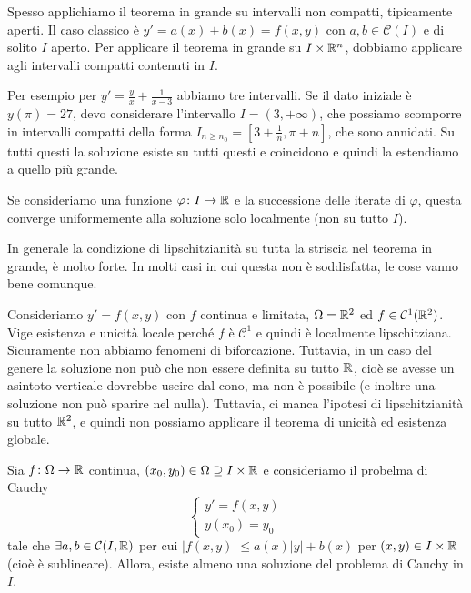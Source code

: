 \documentclass[a4paper]{article}
\begin{document}
Spesso applichiamo il teorema in grande su intervalli non compatti, tipicamente aperti.
Il caso classico è \(y' = a(x) + b(x) = f(x,y)\) con \(a,b \in \mathcal C(I)\)
e di solito \(I\) aperto.
Per applicare il teorema in grande su \(I \times \mathbb{R}^n\),
dobbiamo applicare agli intervalli compatti contenuti in \(I\).

Per esempio per \(y' = \frac yx + \frac 1{x-3}\)
abbiamo tre intervalli. Se il dato iniziale è \(y(\pi) = 27\), devo considerare l'intervallo
\(I = (3, +\infty)\), che possiamo scomporre in intervalli compatti della forma \(I_{n \geq n_0} = \left[3 + \frac 1n, \pi + n\right]\),
che sono annidati. Su tutti questi
la soluzione esiste su tutti questi e coincidono e quindi la estendiamo a quello più grande.

Se consideriamo una funzione \(\varphi \colon I \to \mathbb{R}\) e la successione delle iterate
di \(\varphi\), questa converge uniformemente alla soluzione solo localmente (non su tutto \(I\)).

In generale la condizione di lipschitzianità su tutta la striscia nel teorema in grande,
è molto forte. In molti casi in cui questa non è soddisfatta, le cose vanno bene comunque.

\begin{snippetexample}{}
    Consideriamo
    \(y' = f(x,y)\) con \(f\) continua e limitata, \(\Omega = \mathbb{R}^2\) ed
    \(f \in \mathcal C^1(\mathbb{R}^2)\).
    Vige esistenza e unicità locale perché \(f\)
    è \(\mathcal C^1\) e quindi è localmente lipschitziana.
    Sicuramente non abbiamo fenomeni di biforcazione.
    Tuttavia, in un caso del genere la soluzione non può che non essere definita su tutto \(\mathbb{R}\),
    cioè se avesse un asintoto verticale dovrebbe uscire dal cono, ma non è possibile (e inoltre una soluzione non può sparire nel nulla).
    Tuttavia, ci manca l'ipotesi di lipschitzianità su tutto \(\mathbb{R}^2\),
    e quindi non possiamo applicare il teorema di unicità ed esistenza globale.
\end{snippetexample}

\begin{snippettheorem}{}
    Sia \(f \colon \Omega \to \mathbb{R}\) continua,
    \((x_0, y_0) \in \Omega \supseteq I \times \mathbb{R}\) e consideriamo il probelma di Cauchy
    \[
        \begin{cases}
            y' = f(x,y) \\
            y(x_0) = y_0
        \end{cases}
    \]
    tale che \(\exists a,b \in \mathcal C(I, \mathbb{R})\)
    per cui \(|f(x,y)| \leq a(x)|y| + b(x)\)
    per \((x,y) \in I \times \mathbb{R}\) (cioè è sublineare).
    Allora, esiste almeno una soluzione del problema di Cauchy in \(I\).
\end{snippettheorem}
\end{document}
